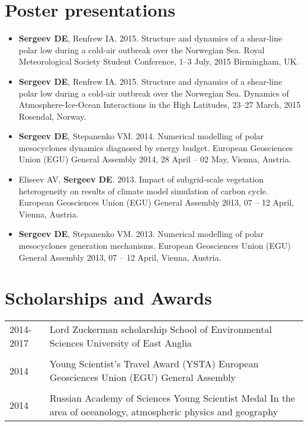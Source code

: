 \documentclass[a4paper,11pt]{article}
\newlength{\mycol}
\begin{document}
\section{Poster presentations}
\begin{itemize}
	\item {\bf Sergeev DE}, Renfrew IA. 2015. Structure and dynamics of a shear-line polar low during a cold-air outbreak over the Norwegian Sea. Royal Meteorological Society Student Conference, 1--3 July, 2015 Birmingham, UK.
    \item {\bf Sergeev DE}, Renfrew IA. 2015. Structure and dynamics of a shear-line polar low during a cold-air outbreak over the Norwegian Sea. Dynamics of Atmosphere-Ice-Ocean Interactions in the High Latitudes, 23--27 March, 2015 Rosendal, Norway.
	\item {\bf Sergeev DE}, Stepanenko VM. 2014. Numerical modelling of polar mesocyclones dynamics diagnosed by energy budget. European Geosciences Union (EGU) General Assembly 2014, 28 April -- 02 May, Vienna, Austria.
	\item Eliseev AV, {\bf Sergeev DE}. 2013. Impact of subgrid-scale vegetation heterogeneity on results of climate model simulation of carbon cycle. European Geosciences Union (EGU) General Assembly 2013, 07 -- 12 April, Vienna, Austria.
	\item {\bf Sergeev DE}, Stepanenko VM. 2013. Numerical modelling of polar mesocyclones generation mechanisms. European Geosciences Union (EGU) General Assembly 2013, 07 -- 12 April, Vienna, Austria.
\end{itemize}

      
\section{Scholarships and Awards}
\begin{tabu} to 	
 \textsc{2014-2017} & Lord Zuckerman scholarship
                    \newline School of Environmental Sciences
                    \newline University of East Anglia \\
  \\
 \textsc{2014} & Young Scientist's Travel Award (YSTA)
                 \newline European Geosciences Union (EGU) General Assembly \\
  \\
 \textsc{2014} & Russian Academy of Sciences Young Scientist Medal
                 \newline In the area of oceanology, atmospheric physics and geography
\end{tabu}
\end{document}
